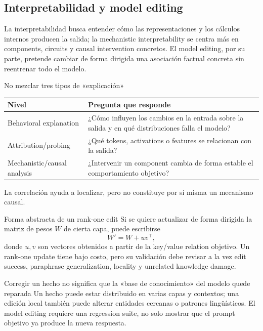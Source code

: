 \subsection{Interpretabilidad y model editing}

La interpretabilidad busca entender cómo las representaciones y los cálculos internos producen la salida; la mechanistic interpretability se centra más en components, circuits y causal intervention concretos. El model editing, por su parte, pretende cambiar de forma dirigida una asociación factual concreta sin reentrenar todo el modelo.


\begin{knowledgebox}{No mezclar tres tipos de «explicación»}
\begin{tabularx}{\textwidth}{L{0.24\textwidth} X}
\toprule
Nivel & Pregunta que responde \\
\midrule
Behavioral explanation & ¿Cómo influyen los cambios en la entrada sobre la salida y en qué distribuciones falla el modelo? \\
Attribution/probing & ¿Qué tokens, activations o features se relacionan con la salida? \\
Mechanistic/causal analysis & ¿Intervenir un component cambia de forma estable el comportamiento objetivo? \\
\bottomrule
\end{tabularx}
La correlación ayuda a localizar, pero no constituye por sí misma un mecanismo causal.
\end{knowledgebox}


\begin{importantbox}{Forma abstracta de un rank-one edit}
Si se quiere actualizar de forma dirigida la matriz de pesos $W$ de cierta capa, puede escribirse
\[
W' = W + uv^\top,
\]
donde $u,v$ son vectores obtenidos a partir de la key/value relation objetivo. Un rank-one update tiene bajo costo, pero su validación debe revisar a la vez edit success, paraphrase generalization, locality y unrelated knowledge damage.
\end{importantbox}

\begin{warningbox}{Corregir un hecho no significa que la «base de conocimiento» del modelo quede reparada}
Un hecho puede estar distribuido en varias capas y contextos; una edición local también puede alterar entidades cercanas o patrones lingüísticos. El model editing requiere una regression suite, no solo mostrar que el prompt objetivo ya produce la nueva respuesta.
\end{warningbox}


